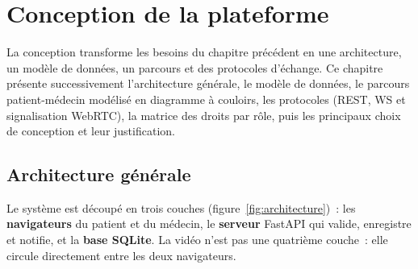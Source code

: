 \chapter{Conception de la plateforme}
\label{chap:conception}

\introchap

La conception transforme les besoins du chapitre précédent en une architecture, un modèle de données, un parcours et des protocoles d'échange. Ce chapitre présente successivement l'architecture générale, le modèle de données, le parcours patient-médecin modélisé en diagramme à couloirs, les protocoles (\ac{REST}, \ac{WS} et signalisation WebRTC), la matrice des droits par rôle, puis les principaux choix de conception et leur justification.

\section{Architecture générale}

Le système est découpé en trois couches (figure~\ref{fig:architecture})~: les \textbf{navigateurs} du patient et du médecin, le \textbf{serveur} FastAPI qui valide, enregistre et notifie, et la \textbf{base SQLite}. La vidéo n'est pas une quatrième couche~: elle circule directement entre les deux navigateurs.

